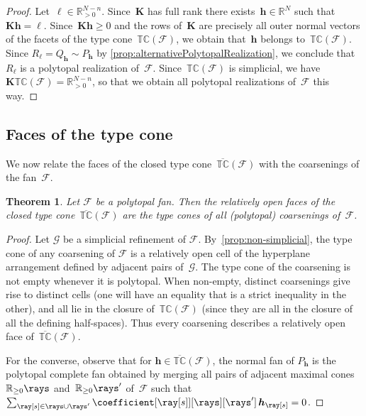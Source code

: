 \documentclass{amsart}
\newtheorem{theorem}{Theorem}[section]
\theoremstyle{definition}
\newcommand{\R}{\mathbb{R}} %
\renewcommand{\c}[1]{{\mathcal{#1}}} %
\renewcommand{\b}[1]{{\boldsymbol{#1}}} %
\newcommand{\Fan}{\mathcal{F}} %
\newcommand{\typeCone}{\mathbb{TC}} %
\newcommand{\ctypeCone}{\overline{\mathbb{TC}}} %
\begin{document}
\begin{proof}
Let~$\b{\ell} \in \R_{>0}^{N-n}$.
Since~$\b{K}$ has full rank there exists~$\b{h} \in \R^N$ such that~$\b{K}\b{h} = \b{\ell}$.
Since~$\b{K}\b{h} \ge 0$ and the rows of~$\b{K}$ are precisely all outer normal vectors of the facets of the type cone~$\typeCone(\Fan)$, we obtain that~$\b{h}$ belongs to~$\typeCone(\Fan)$.
Since $R_\b{\ell} = Q_\b{h} \sim P_\b{h}$ by \cref{prop:alternativePolytopalRealization}, we conclude that~$R_\b{\ell}$ is a polytopal realization of~$\Fan$.
Since~$\typeCone(\Fan)$ is simplicial, we have~$\b{K}\typeCone(\Fan) = \R_{>0}^{N-n}$, so that we obtain all polytopal realizations of~$\Fan$ this way.
\end{proof}


\subsection{Faces of the type cone}
\label{subsec:facesTypeCone}

We now relate the faces of the closed type cone~$\ctypeCone(\Fan)$ with the coarsenings of the fan~$\Fan$.

\begin{theorem}
Let $\Fan$ be a polytopal fan. Then the relatively open faces of the closed type cone~$\ctypeCone(\Fan)$ are the type cones of all (polytopal) coarsenings of~$\Fan$. 
\end{theorem}

\begin{proof}
Let $\c{G}$ be a simplicial refinement of $\Fan$. By~\cref{prop:non-simplicial}, the type cone of any coarsening of $\Fan$ is a relatively open cell of the hyperplane arrangement defined by adjacent pairs of~$\c{G}$. The type cone of the coarsening is not empty whenever it is polytopal. When non-empty, distinct coarsenings give rise to distinct cells (one will have an equality that is a strict inequality in the other), and all lie in the closure of~$\typeCone(\Fan)$ (since they are all in the closure of all the defining half-spaces).
Thus every coarsening describes a relatively open face of~$\ctypeCone(\Fan)$.
 
For the converse, observe that for $\b{h}\in\ctypeCone(\Fan)$, the normal fan of $P_{\b{h}}$ is the polytopal complete fan obtained by merging all pairs of adjacent maximal cones~$\R_{\ge0}\rays$ and~$\R_{\ge0}\rays'$ of~$\Fan$ such that $\sum_{\ray[s] \in \rays \cup \rays'} \coefficient[{\ray[s]}][\rays][\rays'] \, \b{h}_{\ray[s]} = 0$.
\end{proof}
\end{document}
